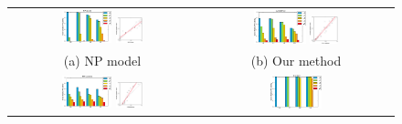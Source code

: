 \begin{figure}[t]
    \centering
    \begin{tabular}{cc}
        \includegraphics[width=0.28\textwidth]{figs/vcl/per_level_response_np.pdf}
        \includegraphics[width=0.15\textwidth]{figs/vcl/correlation_np.pdf} &
        \includegraphics[width=0.28\textwidth]{figs/vcl/per_level_response_vg.pdf}
        \includegraphics[width=0.15\textwidth]{figs/vcl/correlation_vg.pdf} \vspace{-0.0in}\\
        (a) NP model & (b) Our method \\
        \includegraphics[width=0.28\textwidth]{figs/vcl/per_level_response_pm.pdf}
        \includegraphics[width=0.15\textwidth]{figs/vcl/correlation_pm.pdf} &
        \includegraphics[width=0.28\textwidth]{figs/vcl/per_level_response_ic.pdf}

\end{tabular}
\end{figure}
